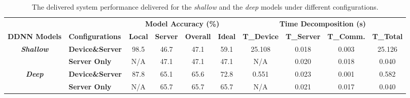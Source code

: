 \documentclass[format=acmsmall, review=false, screen=true]{acmart}
\begin{document}
    \begin{table}[hbt]
    \centering
    \caption{The delivered system performance delivered for the \emph{shallow} and the \emph{deep} models under different configurations.}
    \label{tab:perfresults}
    \scriptsize{
    \begin{tabular}{cl|cccc|cccc}
                                      &                         & \multicolumn{4}{c|}{\textbf{Model Accuracy (\%)}}                    & \multicolumn{4}{c}{\textbf{Time Decomposition (s)}}                            \\
    \textbf{DDNN Models}              & \textbf{Configurations} & \textbf{Local} & \textbf{Server} & \textbf{Overall} & \textbf{Ideal} & \textbf{T\_Device} & \textbf{T\_Server} & \textbf{T\_Comm.} & \textbf{T\_Total} \\ \hline\hline
    \multirow{2}{*}{\textit{\textbf{Shallow}}} & \textbf{Device\&Server} & 98.5           & 46.7            & 47.1             & 59.1           & 25.108             & 0.018              & 0.003             & 25.126             \\ \cline{2-10}
                                      & \textbf{Server Only}    & N/A            & 47.1            & 47.1             & 47.1           & N/A                & 0.020              & 0.018             & 0.040             \\ \hline
    \multirow{2}{*}{\textit{\textbf{Deep}}}    & \textbf{Device\&Server} & 87.8           & 65.1            & 65.6             & 72.8           & 0.551              & 0.023              & 0.001             & 0.582             \\ \cline{2-10}
                                      & \textbf{Server Only}    & N/A            & 65.7            & 65.7             & 65.7           & N/A                & 0.021              & 0.017             & 0.040             \\ \cline{2-10}
    \end{tabular}

    }%

    \end{table}
\end{document}
